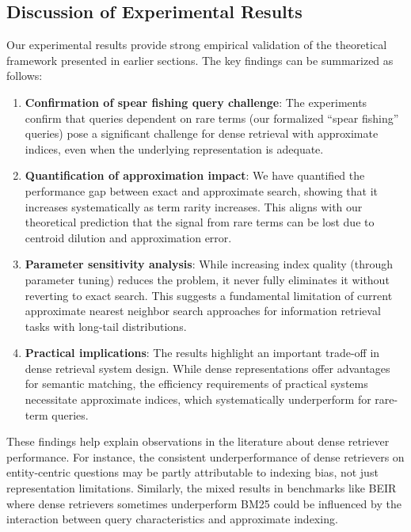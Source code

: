 \documentclass[sigconf,review]{acmart}
\begin{document}
\subsection{Discussion of Experimental Results}

Our experimental results provide strong empirical validation of the theoretical framework presented in earlier sections. The key findings can be summarized as follows:

\begin{enumerate}
    \item \textbf{Confirmation of spear fishing query challenge}: The experiments confirm that queries dependent on rare terms (our formalized ``spear fishing'' queries) pose a significant challenge for dense retrieval with approximate indices, even when the underlying representation is adequate.
    
    \item \textbf{Quantification of approximation impact}: We have quantified the performance gap between exact and approximate search, showing that it increases systematically as term rarity increases. This aligns with our theoretical prediction that the signal from rare terms can be lost due to centroid dilution and approximation error.
    
    \item \textbf{Parameter sensitivity analysis}: While increasing index quality (through parameter tuning) reduces the problem, it never fully eliminates it without reverting to exact search. This suggests a fundamental limitation of current approximate nearest neighbor search approaches for information retrieval tasks with long-tail distributions.
    
    \item \textbf{Practical implications}: The results highlight an important trade-off in dense retrieval system design. While dense representations offer advantages for semantic matching, the efficiency requirements of practical systems necessitate approximate indices, which systematically underperform for rare-term queries.
\end{enumerate}

These findings help explain observations in the literature about dense retriever performance. For instance, the consistent underperformance of dense retrievers on entity-centric questions \cite{sciavolino2021entityquestions} may be partly attributable to indexing bias, not just representation limitations. Similarly, the mixed results in benchmarks like BEIR \cite{thakur2021beir} where dense retrievers sometimes underperform BM25 could be influenced by the interaction between query characteristics and approximate indexing.
\end{document}
